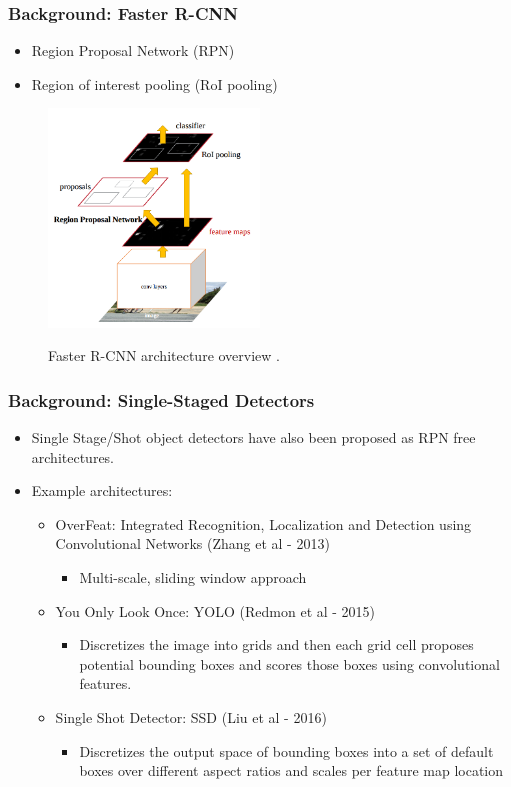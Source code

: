 \documentclass[10pt,fleqn,unknownkeysallowed]{beamer}
\begin{document}
\begin{frame}
	\frametitle{Background: Faster R-CNN}
	\begin{itemize}
		\item{Region Proposal Network (RPN)}
		\item{Region of interest pooling (RoI pooling)}
	\end{itemize}
	\begin{figure}
		\begin{center}
			\includegraphics[width=0.5\textwidth]{images/faster_rcnn} \\
			\caption{Faster R-CNN architecture overview \cite{faster_rcnn}.}
		\end{center}
	\end{figure}
\end{frame}

\begin{frame}
	\frametitle{Background: Single-Staged Detectors}
	\begin{itemize}
		\item{Single Stage/Shot object detectors have also been proposed as RPN free architectures.}
		\item{Example architectures:}
		\begin{itemize}
			\item{OverFeat: Integrated Recognition, Localization and Detection using Convolutional Networks (Zhang et al - 2013)}
			\begin{itemize}
				\item{Multi-scale, sliding window approach}
			\end{itemize}
			\item{You Only Look Once: YOLO (Redmon et al - 2015)}
			\begin{itemize}
				\item{Discretizes the image into
					grids and then each grid cell proposes potential bounding boxes and scores those boxes
					using convolutional features.}
			\end{itemize}
			\item{Single Shot Detector: SSD (Liu et al - 2016)}
			\begin{itemize}
				\item{Discretizes the output space of bounding boxes into a set of default boxes over
					different aspect ratios and scales per feature map location}
			\end{itemize}
		\end{itemize}
	\end{itemize}
\end{frame}
\end{document}
